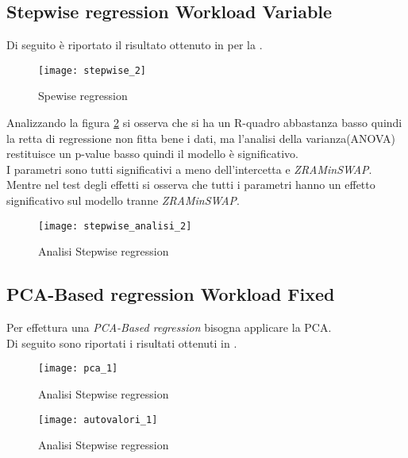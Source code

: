 \subsection{Stepwise regression Workload Variable}

Di seguito è riportato il risultato ottenuto in  per
la .\\

\begin{figure}[!htbp]
  \centering
  \texttt{[image: stepwise\_2]}
  \caption{Spewise regression}
  \label{stepwise_2}
\end{figure}
\clearpage
Analizzando la figura \ref{stepwise_analisi_2} si osserva che si ha un R-quadro
abbastanza basso quindi la retta di regressione non fitta bene i dati, ma l'analisi
della varianza(ANOVA) restituisce un p-value basso quindi il modello è significativo.\\
I parametri sono tutti significativi a meno dell'intercetta e \textit{ZRAMinSWAP}.
Mentre nel test degli effetti si osserva che tutti i parametri hanno un effetto
significativo sul modello tranne \textit{ZRAMinSWAP}.
\begin{figure}[!htbp]
  \centering
  \texttt{[image: stepwise\_analisi\_2]}
  \caption{Analisi Stepwise regression}
  \label{stepwise_analisi_2}
\end{figure}

\clearpage

\subsection{PCA-Based regression Workload Fixed}

Per effettura una \textit{PCA-Based regression} bisogna applicare la PCA.\\
Di seguito sono riportati i risultati ottenuti in .\\

\begin{figure}[!htbp]
  \centering
  \texttt{[image: pca\_1]}
  \caption{Analisi Stepwise regression}
  \label{pca_2}
\end{figure}

\begin{figure}[!htbp]
  \centering
  \texttt{[image: autovalori\_1]}
  \caption{Analisi Stepwise regression}
  \label{autovalori_2}
\end{figure}

